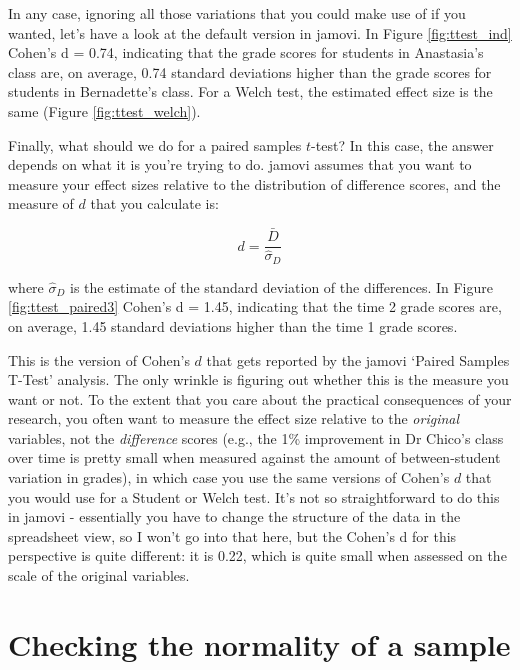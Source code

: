 In any case, ignoring all those variations that you could make use of if you wanted, let's have a look at the default version in jamovi. In Figure \ref{fig:ttest_ind} Cohen's d = 0.74, indicating that the grade scores for students in Anastasia's class are, on average, 0.74 standard deviations higher than the grade scores for students in Bernadette's class. For a Welch test, the estimated effect size is the same (Figure \ref{fig:ttest_welch}).



Finally, what should we do for a paired samples $t$-test? In this case, the answer depends on what it is you're trying to do. jamovi assumes that you want to measure your effect sizes relative to the distribution of difference scores, and the measure of $d$ that you calculate is: 

$$
d = \frac{\bar{D}}{\hat{\sigma}_D}
$$

where $\hat{\sigma}_D$ is the estimate of the standard deviation of the differences. In Figure \ref{fig:ttest_paired3} Cohen's d = 1.45, indicating that the time 2 grade scores are, on average, 1.45 standard deviations higher than the time 1 grade scores.

This is the version of Cohen's $d$ that gets reported by the jamovi `Paired Samples T-Test' analysis. The only wrinkle is figuring out whether this is the measure you want or not. To the extent that you care about the practical consequences of your research, you often want to measure the effect size relative to the {\it original} variables, not the {\it difference} scores (e.g., the 1\% improvement in Dr Chico's class over time is pretty small when measured against the amount of between-student variation in grades), in which case you use the same versions of Cohen's $d$ that you would use for a Student or Welch test. It's not so straightforward to do this in jamovi - essentially you have to change the structure of the data in the spreadsheet view, so I won't go into that here, but the Cohen's d for this perspective is quite different: it is 0.22, which is quite small when assessed on the scale of the original variables.


\section{Checking the normality of a sample\label{sec:shapiro}}


